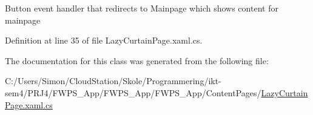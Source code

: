 Button event handler that redirects to Mainpage which shows content for mainpage 

Definition at line 35 of file Lazy\+Curtain\+Page.\+xaml.\+cs.



The documentation for this class was generated from the following file\+:\begin{DoxyCompactItemize}
\item 
C\+:/\+Users/\+Simon/\+Cloud\+Station/\+Skole/\+Programmering/ikt-\/sem4/\+P\+R\+J4/\+F\+W\+P\+S\+\_\+\+App/\+F\+W\+P\+S\+\_\+\+App/\+F\+W\+P\+S\+\_\+\+App/\+Content\+Pages/\mbox{\hyperlink{_lazy_curtain_page_8xaml_8cs}{Lazy\+Curtain\+Page.\+xaml.\+cs}}\end{DoxyCompactItemize}
